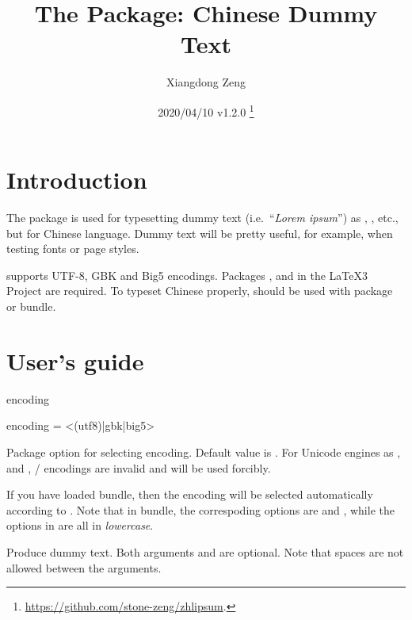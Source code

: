 \documentclass{ctxdoc}
\title{\textbf{The \pkg{zhlipsum} Package: Chinese Dummy Text}}
\author{Xiangdong Zeng}
\date{2020/04/10 \quad v1.2.0%
  \thanks{\url{https://github.com/stone-zeng/zhlipsum}.}}
\begin{document}

\maketitle

\section{Introduction}

The  package is used for typesetting dummy text
(i.e.\ ``\emph{Lorem ipsum}'') as ,
,  etc., but for Chinese
language. Dummy text will be pretty useful, for example, when
testing fonts or page styles.

 supports UTF-8, GBK and Big5 encodings. Packages
,  and  in the \LaTeX3{}
Project are required. To typeset Chinese properly, 
should be used with  package or \CTeX{} bundle.

\section{User's guide} \label{sec:user-guide}

\begin{function}[added=2017-09-16,updated=2018-04-01]{encoding}
  \begin{syntax}
    encoding = <(utf8)|gbk|big5>
  \end{syntax}
  Package option for selecting encoding. Default value is
  . For Unicode engines as \XeLaTeX{}, \LuaLaTeX{} and
  \upLaTeX{},  /  encodings are invalid and
   will be used forcibly.
\end{function}

If you have loaded \CTeX{} bundle, then the encoding will be
selected automatically according to \CTeX{}. Note that in \CTeX{}
bundle, the correspoding options are  and ,
while the options in  are all in \emph{lowercase}.

\begin{function}[updated=2020-04-08]{\zhlipsum}
  \begin{syntax}
  \end{syntax}
  Produce dummy text. Both arguments  and
   are optional. Note that spaces are not allowed
  between the arguments.
\end{function}
\end{document}
